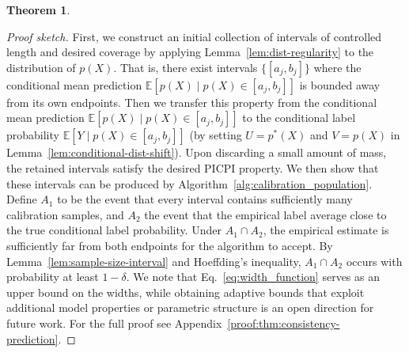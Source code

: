 \documentclass[11pt]{article}
\theoremstyle{statplain}
\newtheorem{theorem}{Theorem}[section]
\theoremstyle{statdefinition}
\newenvironment{proofsketch}
  {\begin{proof}[Proof sketch]\renewcommand{\qedsymbol}{}}
  {\end{proof}}
\newcommand{\E}{\mathbb{E}}
\newcommand{\0}{\mathbf{0}}
\newcommand{\I}{\mathcal{I}}
\newcommand{\estModel}{p} %
\newcommand{\titleShort}{PICPI\xspace}
\begin{document}
\begin{theorem}
\end{theorem}

\begin{proofsketch}
    First, we construct an initial collection of intervals of controlled length and desired coverage by applying Lemma~\ref{lem:dist-regularity} to the distribution of $p(X)$. That is, there exist intervals $\{[a_j,b_j]\}$ where the conditional mean prediction $\E[p(X) \mid p(X)\in [a_j, b_j]]$ is bounded away from its own endpoints. Then we transfer this property from the conditional mean prediction $\E[p(X)\mid p(X)\in [a_j, b_j]]$ to the conditional label probability $\E[Y \mid p(X)\in [a_j, b_j]]$ (by setting $U=p^*(X)$ and $V=p(X)$ in Lemma~\ref{lem:conditional-dist-shift}). Upon discarding a small amount of mass, the retained intervals satisfy the desired \titleShort property. We then show that these intervals can be produced by Algorithm~\ref{alg:calibration_population}. Define $A_1$ to be the event that every interval contains sufficiently many calibration samples, and $A_2$ the event that the empirical label average close to the true conditional label probability. Under $A_1\cap A_2$, the empirical estimate is sufficiently far from both endpoints for the algorithm to accept. By Lemma~\ref{lem:sample-size-interval} and Hoeffding's inequality, $A_1\cap A_2$ occurs with probability at least $1-\delta$. We note that Eq.~\eqref{eq:width_function} serves as an upper bound on the widths, while obtaining adaptive bounds that exploit additional model properties or parametric structure is an open direction for future work. For the full proof see
Appendix~\ref{proof:thm:consistency-prediction}.
\end{proofsketch}




\end{document}
